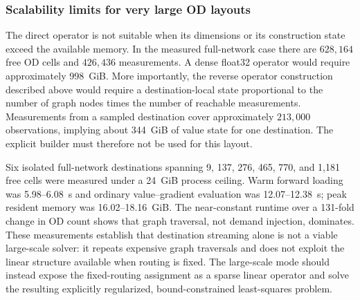\subsubsection{Scalability limits for very large OD layouts}

The direct operator is not suitable when its dimensions or its construction
state exceed the available memory. In the measured full-network case there are
$628{,}164$ free OD cells and $426{,}436$ measurements. A dense float32
operator would require approximately 998~GiB. More importantly, the reverse
operator construction described above would require a destination-local state
proportional to the number of graph nodes times the number of reachable
measurements. Measurements from a sampled destination cover approximately
$213{,}000$ observations, implying about 344~GiB of value state for one
destination. The explicit builder must therefore not be used for this layout.

Six isolated full-network destinations spanning 9, 137, 276, 465, 770, and
1,181 free cells were measured under a 24~GiB process ceiling. Warm forward
loading was 5.98--6.08~s and ordinary value--gradient evaluation was
12.07--12.38~s; peak resident memory was 16.02--18.16~GiB. The near-constant
runtime over a 131-fold change in OD count shows that graph traversal, not
demand injection, dominates. These measurements establish that destination
streaming alone is not a viable large-scale solver: it repeats expensive graph
traversals and does not exploit the linear structure available when routing is
fixed. The large-scale mode should instead expose the fixed-routing assignment
as a sparse linear operator and solve the resulting explicitly regularized,
bound-constrained least-squares problem.

